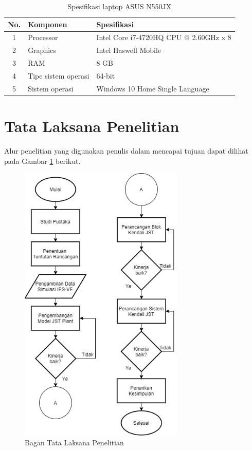 \vspace{2em}
\begin{table}[!h]
	\caption{Spesifikasi laptop ASUS N550JX}
	\label{tbl:4:speklaptop}
	\centering
	\begin{tabular}{|c|p{5cm}|p{8cm}|}
		\hline
		No. & Komponen & Spesifikasi \\ \hline
		1 & Processor & Intel Core i7-4720HQ CPU @ 2.60GHz x 8 \\ \hline
		2 & Graphics & Intel Haswell Mobile \\ \hline
		3 & RAM & 8 GB \\ \hline
		4 & Tipe sistem operasi & 64-bit \\ \hline
		5 & Sistem operasi & Windows 10 Home Single Language \\ \hline
	\end{tabular}
\end{table}

\vspace{2em}
\section{Tata Laksana Penelitian}
Alur penelitian yang digunakan penulis dalam mencapai tujuan dapat dilihat pada Gambar \ref{fig:4:TataLaksanaPenelitian} berikut.
\begin{figure}[!b]
	\centering
	\includegraphics[width=0.7\textwidth]{figures/TataLaksanaPenelitian}
	\caption{Bagan Tata Laksana Penelitian}
	\label{fig:4:TataLaksanaPenelitian}
\end{figure}


